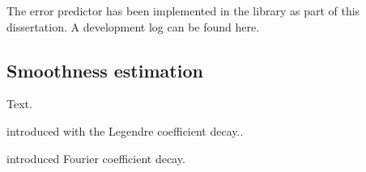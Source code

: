 The error predictor has been implemented in the \dealii library as part of this dissertation. A development log can be found here.



\subsection{Smoothness estimation}
\label{ssec:smoothness}

Text.

\cite{mavriplis1994} introduced with the Legendre coefficient decay..


\cite{bangerth2009} introduced Fourier coefficient decay.